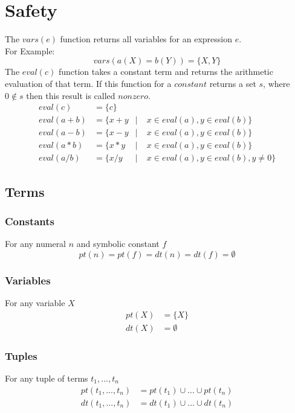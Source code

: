 \documentclass{article}
\newcommand{\set}[1]{\{#1\}}
\begin{document}
	\section{Safety}
	The $\mathit{vars(e)}$ function returns all variables for an expression $e$.
	\\ For Example:
	\begin{equation*}
		vars(a(X) = b(Y)) = \set{X,Y}
	\end{equation*}
	The $\mathit{eval(c)}$ function takes a constant term and returns the arithmetic evaluation of that term. If this function for a $\mathit{constant}$ returns a set $s$, where $0 \notin s $ then this result is called $\mathit{nonzero}$.
	\begin{align*}
		\mathit{eval}(c) &= \set{c} && \\
		\mathit{eval}(a + b) &= \set{ x + y &|\;& x \in eval(a), y \in eval(b) } \\
		\mathit{eval}(a - b) &= \set{ x - y &|\;& x \in eval(a), y \in eval(b) } \\
		\mathit{eval}(a * b) &= \set{ x * y &|\;& x \in eval(a), y \in eval(b) } \\
		\mathit{eval}(a / b) &= \set{ x / y &|\;& x \in eval(a), y \in eval(b), y \neq 0 }
	\end{align*}

	\subsection{Terms}
	\subsubsection{Constants}
	For any numeral $n$ and symbolic constant $f$
	\begin{equation*}
		pt(n) = pt(f) = dt(n) = dt(f) = \emptyset
	\end{equation*}

	\subsubsection{Variables}
	For any variable $X$
	\begin{align*}
		pt(X) &= \set{X} \\
		dt(X) &= \emptyset
	\end{align*}

	\subsubsection{Tuples}
	For any tuple of terms $t_1,...,t_n$
	\begin{align*}
		pt(t_1,...,t_n) &= pt(t_1) \cup \dots \cup pt(t_n) \\
		dt(t_1,...,t_n) &= dt(t_1) \cup \dots \cup dt(t_n)
	\end{align*}
\end{document}
